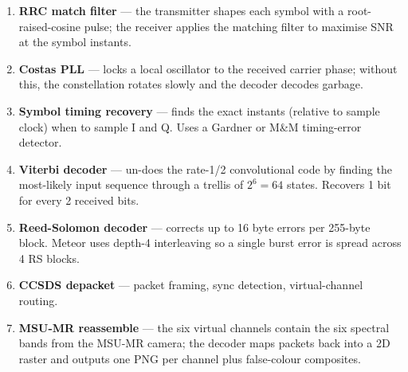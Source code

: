 \documentclass[11pt,a4paper]{article}
\begin{document}
\begin{center}
\end{center}

\begin{enumerate}
  \item \textbf{RRC match filter} — the transmitter shapes each
        symbol with a root-raised-cosine pulse; the receiver applies
        the matching filter to maximise SNR at the symbol instants.
  \item \textbf{Costas PLL} — locks a local oscillator to the
        received carrier phase; without this, the constellation
        rotates slowly and the decoder decodes garbage.
  \item \textbf{Symbol timing recovery} — finds the exact instants
        (relative to sample clock) when to sample I and Q.  Uses a
        Gardner or M\&M timing-error detector.
  \item \textbf{Viterbi decoder} — un-does the rate-1/2 convolutional
        code by finding the most-likely input sequence through a
        trellis of $2^6 = 64$ states.  Recovers 1 bit for every 2
        received bits.
  \item \textbf{Reed-Solomon decoder} — corrects up to 16 byte
        errors per 255-byte block.  Meteor uses depth-4 interleaving
        so a single burst error is spread across 4 RS blocks.
  \item \textbf{CCSDS depacket} — packet framing, sync detection,
        virtual-channel routing.
  \item \textbf{MSU-MR reassemble} — the six virtual channels contain
        the six spectral bands from the MSU-MR camera; the decoder
        maps packets back into a 2D raster and outputs one PNG per
        channel plus false-colour composites.
\end{enumerate}
\end{document}
